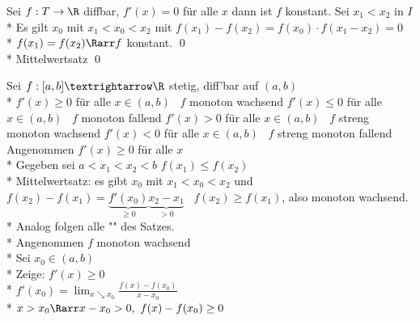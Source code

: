 Sei $f: T \to \R$ diffbar, $f'(x) = 0$ für alle $x$ dann ist $f$ konstant.
\bew
Sei $x_1 < x_2$ in $I$\\*
Es gilt $x_0$ mit $x_1 < x_0 < x_2$ mit $f(x_1) - f(x_2) = f(x_0) \cdot f(x_1 - x_2) = 0$\\*
\Rarr{} $f(x_1) = f(x_2) \Rarr f$ konstant. \qed{}\\*
Mittelwertsatz \qed

Sei $f:[a,b]→\R$ stetig, diff'bar auf $(a,b)$\\*
$f'(x)\geq 0$ für alle $x\in (a,b)$ \equ\ $f$ monoton wachsend
$f'(x)\leq 0$ für alle $x\in (a,b)$ \equ\ $f$ monoton fallend
$f'(x)> 0$ für alle $x\in (a,b)$ \Rarr\ $f$ streng monoton wachsend
$f'(x)< 0$ für alle $x\in (a,b)$ \Rarr\ $f$ streng monoton fallend
\bew
Angenommen $f'(x)\geq 0$ für alle $x$\\*
Gegeben sei $a<x_1<x_2<b$
$f(x_1)\leq f(x_2)$\\*
Mittelwertsatz: es gibt $x_0$ mit $x_1<x_0<x_2$ und $f(x_2)-f(x_1)=\underbrace{f'(x_0)}_{\geq 0}\underbrace{x_2-x_1}_{>0}$ \Rarr\ $f(x_2)\geq f(x_1)$, also monoton wachsend.\\*
Analog folgen alle "\Rarr" des Satzes.\\*
Angenommen $f$ monoton wachsend\\*
Sei $x_0 \in (a, b)$\\*
Zeige: $f'(x) \geq 0$\\*
$f'(x_0) = \lim_{x \searrow x_0}\frac{f(x) - f(x_0)}{x - x_0}$\\*
$x > x_0 \Rarr x - x_0 > 0,\ f(x) - f(x_0) \geq 0$

